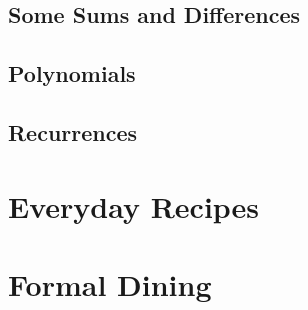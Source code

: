 \documentclass[10pt,oneside,tightlist]{memoir}
\begin{document}
\chapter{Some Sums and Differences}

\chapter{Polynomials}

\chapter{Recurrences}


\part{Everyday Recipes}

\part{Formal Dining}

%
%
%
%
\end{document}
